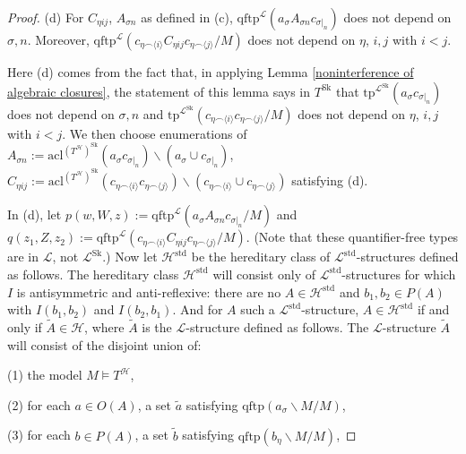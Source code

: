 \documentclass{amsart}
\theoremstyle{definition}
\theoremstyle{remark}
\numberwithin{equation}{section}
\begin{document}
\begin{proof}
    (d) For $C_{\eta ij}$, $A_{\sigma n}$ as defined in (c), $\mathrm{qftp}^{\mathcal{L}}(a_{\sigma} A_{\sigma n}c_{\sigma|_{n}})$ does not depend on $\sigma, n$. Moreover, $ \mathrm{qftp}^{\mathcal{L}}(c_{\eta \smallfrown \langle i \rangle }C_{\eta ij} c_{\eta \smallfrown \langle j \rangle }/M)$ does not depend on $\eta$, $i, j$ with $i < j$. 

Here (d) comes from the fact that, in applying Lemma \ref{noninterference of algebraic closures}, the statement of this lemma says in $T^{\mathrm{Sk}}$ that $\mathrm{tp}^{\mathcal{L}^{\mathrm{Sk}}}(a_{\sigma}c_{\sigma|_{n}})$ does not depend on $\sigma, n$ and  $ \mathrm{tp}^{\mathcal{L}^{\mathrm{Sk}}}(c_{\eta \smallfrown \langle i \rangle } c_{\eta \smallfrown \langle j \rangle }/M)$ does not depend on $\eta$, $i, j$ with $i < j$. We then choose enumerations of $A_{\sigma n}:=\mathrm{acl}^{(T^{\mathcal{H}})^{\mathrm{Sk}}}(a_{\sigma}c_{\sigma|_{n}})\backslash(a_{\sigma} \cup c_{\sigma|_{n}})$, $C_{\eta ij}:= \mathrm{acl}^{(T^{\mathcal{H}})^{\mathrm{Sk}}}(c_{\eta \smallfrown \langle i \rangle } c_{\eta \smallfrown \langle j \rangle }) \backslash (c_{\eta \smallfrown \langle i \rangle } \cup c_{\eta \smallfrown \langle j \rangle }) $ satisfying (d).

In (d), let $p(w, W, z)  :=\mathrm{qftp}^{\mathcal{L}}(a_{\sigma} A_{\sigma n}c_{\sigma|_{n}}/M)$ and $q(z_{1}, Z, z_{2}):= \mathrm{qftp}^{\mathcal{L}}(c_{\eta \smallfrown \langle i \rangle }C_{\eta ij} c_{\eta \smallfrown \langle j \rangle }/M)$. (Note that these quantifier-free types are in $\mathcal{L}$, not $\mathcal{L}^{\mathrm{Sk}}$.) Now let $\mathcal{H}^{\mathrm{std}}$ be the hereditary class of $\mathcal{L}^{\mathrm{std}}$-structures defined as follows. The hereditary class $\mathcal{H}^{\mathrm{std}}$ will consist only of $\mathcal{L}^{\mathrm{std}}$-structures for which $I$ is antisymmetric and anti-reflexive: there are no $A \in \mathcal{H}^{\mathrm{std}}$ and $b_1, b_2 \in P(A)$ with $I(b_1, b_2)$ and $I(b_2, b_1)$. And for $A$ such a $\mathcal{L}^{\mathrm{std}}$-structure, $A \in \mathcal{H}^{\mathrm{std}}$ if and only if  $\tilde{A} \in \mathcal{H}$, where $\tilde{A}$ is the $\mathcal{L}$-structure defined as follows. The $\mathcal{L}$-structure $\tilde{A}$ will consist of the disjoint union of:

  (1) the model $M \models T^{\mathcal{H}}$,

    (2) for each $a \in O(A)$, a set $\tilde{a}$ satisfying $\mathrm{qftp}(a_{\sigma}\backslash M/M)$,

    (3) for each $b \in P(A)$, a set $\tilde{b}$ satisfying $\mathrm{qftp}(b_{\eta}\backslash M/M)$,



\end{proof}
\end{document}
